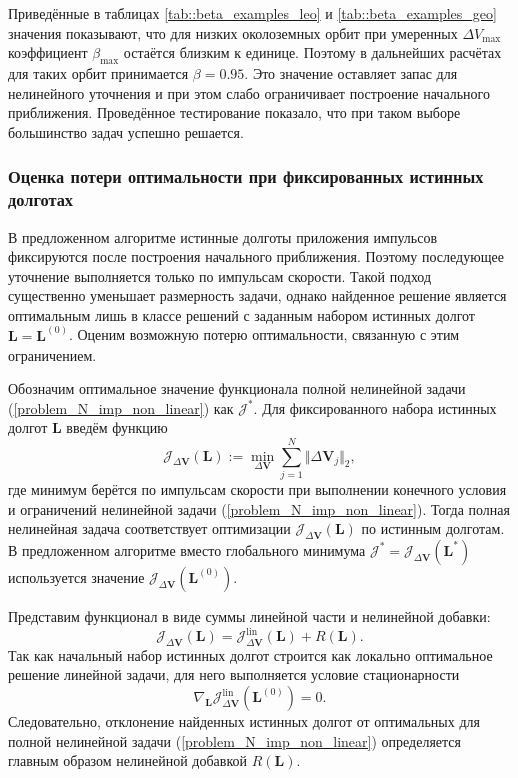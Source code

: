Приведённые в таблицах \ref{tab::beta_examples_leo} и \ref{tab::beta_examples_geo} значения показывают, что для низких околоземных орбит при умеренных $\Delta V_{\max}$ коэффициент $\beta_{\max}$ остаётся близким к единице. Поэтому в дальнейших расчётах для таких орбит принимается $\beta = 0.95$. Это значение оставляет запас для нелинейного уточнения и при этом слабо ограничивает построение начального приближения. Проведённое тестирование показало, что при таком выборе большинство задач успешно решается.

\subsubsection{Оценка потери оптимальности при фиксированных истинных долготах}

В предложенном алгоритме истинные долготы приложения импульсов фиксируются после построения начального приближения. Поэтому последующее уточнение выполняется только по импульсам скорости. Такой подход существенно уменьшает размерность задачи, однако найденное решение является оптимальным лишь в классе решений с заданным набором истинных долгот $\mathbf{L} = \mathbf{L}^{(0)}$. Оценим возможную потерю оптимальности, связанную с этим ограничением.

Обозначим оптимальное значение функционала полной нелинейной задачи (\ref{problem_N_imp_non_linear}) как $\mathcal{J}^*$. Для фиксированного набора истинных долгот $\mathbf{L}$ введём функцию 
\begin{equation}
    \mathcal{J}_{\Delta \mathbf{V}} (\mathbf{L}) := 
    \min_{\Delta \mathbf{V}} \sum_{j=1}^N \Vert \Delta \mathbf{V}_j \Vert_2,
\end{equation}
где минимум берётся по импульсам скорости при выполнении конечного условия и ограничений нелинейной задачи (\ref{problem_N_imp_non_linear}). Тогда полная нелинейная задача соответствует оптимизации $\mathcal{J}_{\Delta \mathbf{V}} (\mathbf{L})$ по истинным долготам. В предложенном алгоритме вместо глобального минимума $\mathcal{J}^* = \mathcal{J}_{\Delta \mathbf{V}} (\mathbf{L}^*)$ используется значение $\mathcal{J}_{\Delta \mathbf{V}} (\mathbf{L}^{(0)})$. 

Представим функционал в виде суммы линейной части и нелинейной добавки:
\begin{equation}
    \mathcal{J}_{\Delta \mathbf{V}} (\mathbf{L}) = 
    \mathcal{J}_{\Delta \mathbf{V}}^{\text{lin}} (\mathbf{L}) + 
    R(\mathbf{L}).
\end{equation}
Так как начальный набор истинных долгот строится как локально оптимальное решение линейной задачи, для него выполняется условие стационарности
\begin{equation}
    \nabla_{\mathbf{L}} \mathcal{J}_{\Delta \mathbf{V}}^{\text{lin}} (\mathbf{L}^{(0)}) = 0.
\end{equation}
Следовательно, отклонение найденных истинных долгот от оптимальных для полной нелинейной задачи (\ref{problem_N_imp_non_linear}) определяется главным образом нелинейной добавкой $R(\mathbf{L})$. 

